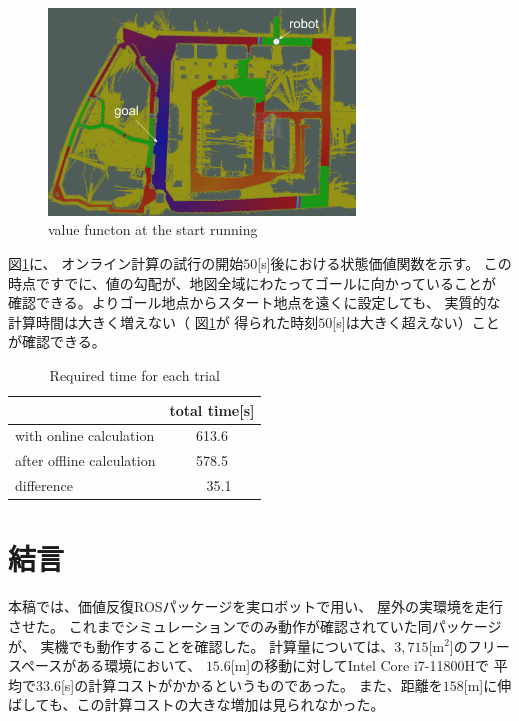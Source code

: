 \documentclass{jarticle}
\begin{document}
\begin{figure}[htb]
  \centering
   \includegraphics[height=55mm]{./figs/raspicat-value-function.png}
   \caption{value functon at the start running}
	\label{fig:raspicat-value-function}
\end{figure}

図\ref{fig:raspicat-value-function}に、
オンライン計算の試行の開始$50$[s]後における状態価値関数を示す。
この時点ですでに、値の勾配が、地図全域にわたってゴールに向かっていることが
確認できる。よりゴール地点からスタート地点を遠くに設定しても、
実質的な計算時間は大きく増えない（
図\ref{fig:raspicat-value-function}が
得られた時刻$50$[s]は大きく超えない）ことが確認できる。

\begin{table}[hbtp]
	\caption{Required time for each trial}
	\label{table:result2}
	\centering
	\begin{small}
	 \begin{tabular}{l|c}
		\hline
		 & total time[s] \\
		\hline \hline
		with online calculation & 613.6 \\
		after offline calculation & 578.5 \\
		\hline
		 difference & \ \ 35.1 \\
		\hline
	 \end{tabular}
	\end{small}
\end{table}


\section{結言}%

本稿では、価値反復ROSパッケージを実ロボットで用い、
屋外の実環境を走行させた。
これまでシミュレーションでのみ動作が確認されていた同パッケージが、
実機でも動作することを確認した。
計算量については、$3,715$[m$^2$]のフリースペースがある環境において、
$15.6$[m]の移動に対してIntel Core i7-11800Hで
平均で$33.6$[s]の計算コストがかかるというものであった。
また、距離を$158$[m]に伸ばしても、この計算コストの大きな増加は見られなかった。
\end{document}
